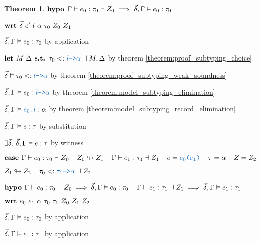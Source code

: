 \documentclass[acmsmall]{acmart}
\theoremstyle{definition}
\newtheorem{theorem}{Theorem}[section]
\begin{document}
\begin{theorem}
  \item \Z $\textbf{hypo } 
    \Gamma \vdash e_0 : \tau_0 \dashv Z_0 
    \implies 
    \vec{\delta}, \Gamma \vDash e_0 : \tau_0
  $ 
  \item \Z $\B{wrt } \vec{\delta}\ e' \ l \ \alpha \ \tau_0 \ Z_0 \ Z_1$ 

    \item \Z\Z $
      \vec{\delta}, \Gamma \vDash e_0 : \tau_0
    $ by application

    \item \Z\Z $
      \B{let }
      M\ \Delta
      \B{ s.t. }
      \tau_0 \subtypes \obj{$l$->$\alpha$} \given M, \Delta
    $ by theorem \ref{theorem:proof_subtyping_choice}


    \item \Z\Z $
      \vec{\delta} \satisfies \tau_0  \subtypes \obj{$l$->$\alpha$}
    $ by theorem \ref{theorem:proof_subtyping_weak_soundness}
    \item \Z\Z $
      \vec{\delta}, \Gamma \satisfies e_0 \hastype \obj{$l$->$\alpha$}
    $ by theorem \ref{theorem:model_subtyping_elimination} 
    \item \Z\Z $
      \vec{\delta}, \Gamma \satisfies \obj{$e_0$.$l$} \hastype \alpha 
    $ by theorem \ref{theorem:model_subtyping_record_elimination} 
    \item \Z\Z $
      \vec{\delta}, \Gamma \vDash e : \tau
    $ by substitution 
    \item \Z\Z $
      \exists \vec{\delta} .\ \vec{\delta}, \Gamma \vDash e : \tau
    $ by witness 


  \item \Z $\B{case } 
    \Gamma \entails e_0 \hastype \tau_0 \given Z_0
    \I
    Z_0 \looparrowright Z_1
    \I
    \Gamma \entails e_1 \hastype \tau_1 \given Z_1
    \I
    e = \obj{$e_0$($e_1$)} 
    \I 
    \tau = \alpha 
    \I
    Z = Z_2
  $ 
  \item \Z $ 
    Z_1 \looparrowright Z_2
    \I
    \tau_0 \subtypes \obj{$\tau_1$->$\alpha$} \given Z_2
  $ 
  \item \Z $\textbf{hypo } 
    \Gamma \vdash e_0 : \tau_0 \dashv Z_0
    \implies 
    \vec{\delta}, \Gamma \vDash e_0 : \tau_0
    \hspace{4mm}
    \Gamma \vdash e_1 : \tau_1 \dashv Z_1
    \implies 
    \vec{\delta}, \Gamma \vDash e_1 : \tau_1
  $ 
  \item \Z $\B{wrt } e_0\ e_1\ \alpha\ \tau_0\ \tau_1\ Z_0\ Z_1\ Z_2 $ 
    \item \Z\Z $
      \vec{\delta}, \Gamma \vDash e_0 : \tau_0
    $ by application
    \item \Z\Z $
      \vec{\delta}, \Gamma \vDash e_1 : \tau_1
    $ by application


\end{theorem}
\end{document}
